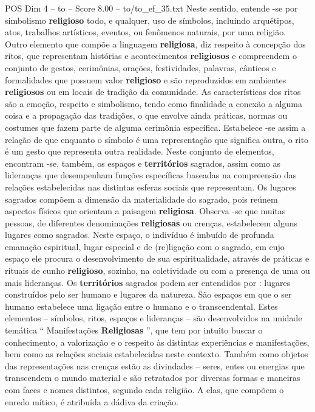 \begin{textsample}{POS Dim 4 – to – Score 8.00 – to/to\_ef\_35.txt}
Neste sentido, entende -se por simbolismo \textbf{religioso} todo, e qualquer, uso de símbolos, incluindo arquétipos, atos, trabalhos artísticos, eventos, ou fenômenos naturais, por uma religião.
Outro elemento que compõe a linguagem \textbf{religiosa}, diz respeito à concepção dos ritos, que representam histórias e acontecimentos \textbf{religiosos} e compreendem o conjunto de gestos, cerimônias, orações, festividades, palavras, cânticos e formalidades que possuem valor \textbf{religioso} e são reproduzidos em ambientes \textbf{religiosos} ou em locais de tradição da comunidade.
As características dos ritos são a emoção, respeito e simbolismo, tendo como finalidade a conexão a alguma coisa e a propagação das tradições, o que envolve ainda práticas, normas ou costumes que fazem parte de alguma cerimônia específica.
Estabelece -se assim a relação de que enquanto o símbolo é uma representação que significa outra, o rito é um gesto que representa outra realidade.
Neste conjunto de elementos, encontram -se, também, os espaços e \textbf{territórios} sagrados, assim como as lideranças que desempenham funções específicas baseadas na compreensão das relações estabelecidas nas distintas esferas sociais que representam.
Os lugares sagrados compõem a dimensão da materialidade do sagrado, pois reúnem aspectos físicos que orientam a paisagem \textbf{religiosa}.
Observa -se que muitas pessoas, de diferentes denominações \textbf{religiosas} ou crenças, estabelecem alguns lugares como sagrados.
Neste espaço, o indivíduo é imbuído de profunda emanação espiritual, lugar especial e de (re)ligação com o sagrado, em cujo espaço ele procura o desenvolvimento de sua espiritualidade, através de práticas e rituais de cunho \textbf{religioso}, sozinho, na coletividade ou com a presença de uma ou mais lideranças.
Os \textbf{territórios} sagrados podem ser entendidos por : lugares construídos pelo ser humano e lugares da natureza.
São espaços em que o ser humano estabelece uma ligação entre o humano e o transcendental.
Estes elementos – símbolos, ritos, espaços e lideranças – são desenvolvidos na unidade temática “ Manifestações \textbf{Religiosas} ”, que tem por intuito buscar o conhecimento, a valorização e o respeito às distintas experiências e manifestações, bem como as relações sociais estabelecidas neste contexto.
Também como objetos das representações nas crenças estão as divindades – seres, entes ou energias que transcendem o mundo material e são retratados por diversas formas e maneiras com faces e nomes distintos, segundo cada religião.
A elas, que compõem o enredo mítico, é atribuída a dádiva da criação.

\end{textsample}
